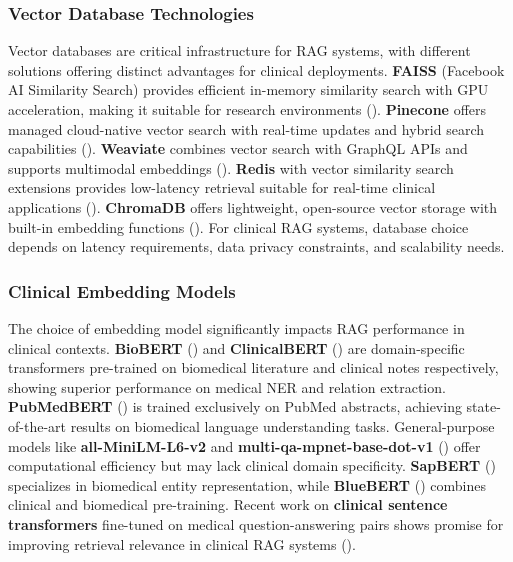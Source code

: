 \subsubsection{Vector Database Technologies}
Vector databases are critical infrastructure for RAG systems, with different solutions offering distinct advantages for clinical deployments. \textbf{FAISS} (Facebook AI Similarity Search) provides efficient in-memory similarity search with GPU acceleration, making it suitable for research environments (\citep{johnson2019faiss}). \textbf{Pinecone} offers managed cloud-native vector search with real-time updates and hybrid search capabilities (\citep{pinecone2023}). \textbf{Weaviate} combines vector search with GraphQL APIs and supports multimodal embeddings (\citep{weaviate2023}). \textbf{Redis} with vector similarity search extensions provides low-latency retrieval suitable for real-time clinical applications (\citep{redis2023vector}). \textbf{ChromaDB} offers lightweight, open-source vector storage with built-in embedding functions (\citep{chromadb2023}). For clinical RAG systems, database choice depends on latency requirements, data privacy constraints, and scalability needs.

\subsubsection{Clinical Embedding Models}
The choice of embedding model significantly impacts RAG performance in clinical contexts. \textbf{BioBERT} (\citep{lee2020biobert}) and \textbf{ClinicalBERT} (\citep{alsentzer2019clinicalbert}) are domain-specific transformers pre-trained on biomedical literature and clinical notes respectively, showing superior performance on medical NER and relation extraction. \textbf{PubMedBERT} (\citep{gu2021pubmedbert}) is trained exclusively on PubMed abstracts, achieving state-of-the-art results on biomedical language understanding tasks. General-purpose models like \textbf{all-MiniLM-L6-v2} and \textbf{multi-qa-mpnet-base-dot-v1} (\citep{reimers2019sentencebert}) offer computational efficiency but may lack clinical domain specificity. \textbf{SapBERT} (\citep{liu2021sapbert}) specializes in biomedical entity representation, while \textbf{BlueBERT} (\citep{peng2019bluebert}) combines clinical and biomedical pre-training. Recent work on \textbf{clinical sentence transformers} fine-tuned on medical question-answering pairs shows promise for improving retrieval relevance in clinical RAG systems (\citep{zhang2023clinical}).

